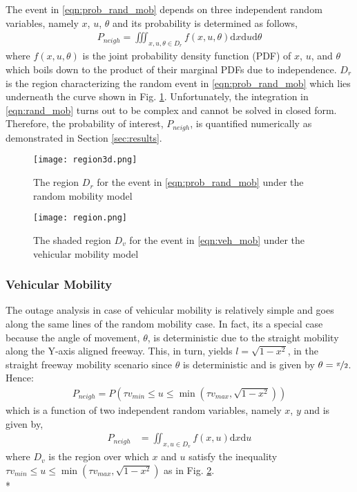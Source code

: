 \documentclass[conference,a4paper]{IEEEtran}
\begin{document}
The event in \eqref{eqn:prob_rand_mob} depends on three independent random variables, namely $x$, $u$, $\theta$ and its probability is determined as follows,
\begin{align}
P_{neigh} = \iiint_{x,u,\theta \in D_r}{f(x,u,\theta)}\mathrm{d}x\mathrm{d}u\mathrm{d}\theta \label{eqn:rand_mob}
\end{align}
\noindent where $f(x,u,\theta)$ is the joint probability density function (PDF) of $x$, $u$, and $\theta$ which boils down to the product of their marginal PDFs due to independence. $D_r$ is the region characterizing the random event in \eqref{eqn:prob_rand_mob} which lies underneath the curve shown in Fig. \ref{Flo:region3d}. Unfortunately, the integration in \eqref{eqn:rand_mob} turns out to be complex and cannot be solved in closed form. Therefore, the probability of interest, $P_{neigh}$, is quantified numerically as demonstrated in Section \ref{sec:results}.
\begin{figure}[!t]
\centering
\texttt{[image: region3d.png]}
\setlength{\abovecaptionskip}{0pt}
\setlength{\belowcaptionskip}{-10pt}
\caption{The region $D_r$ for the event in \eqref{eqn:prob_rand_mob} under the random mobility model}
\label{Flo:region3d}
\end{figure}
\begin{figure}[!t]
\centering
\texttt{[image: region.png]}
\setlength{\abovecaptionskip}{5pt}
\setlength{\belowcaptionskip}{-20pt}
\caption{The shaded region $D_v$ for the event in \eqref{eqn:veh_mob} under the vehicular mobility model}
\label{Flo:region}
\end{figure}


\subsubsection{Vehicular Mobility}
The outage analysis in case of vehicular mobility is relatively simple and goes along the same lines of the random mobility case. In fact, its a special case because the angle of movement, $\theta$, is deterministic due to the straight mobility along the Y-axis aligned freeway. This, in turn, yields $l = \sqrt{1-x^2}$, in the straight freeway mobility scenario since $\theta$ is deterministic and is given by $\theta = \nicefrac{\pi}{2}$. Hence:
\begin{align}
P_{neigh} = P(\tau v_{min} \leq u \leq \min(\tau v_{max}, \sqrt{1-x^2})) \label{eqn:prob_veh_mob}
\end{align}
which is a function of two independent random variables, namely $x$, $y$ and is given by,
\begin{align}
P_{neigh} &= \iint_{x,u\in D_v}{f(x,u)}\mathrm{d}x\mathrm{d}u \label{eqn:veh_mob}
\end{align}
\noindent where $D_v$ is the region over which $x$ and $u$ satisfy the inequality $\tau v_{min} \leq u \leq \min(\tau v_{max}, \sqrt{1-x^2})$ as in Fig. \ref{Flo:region}.\\*
\end{document}
